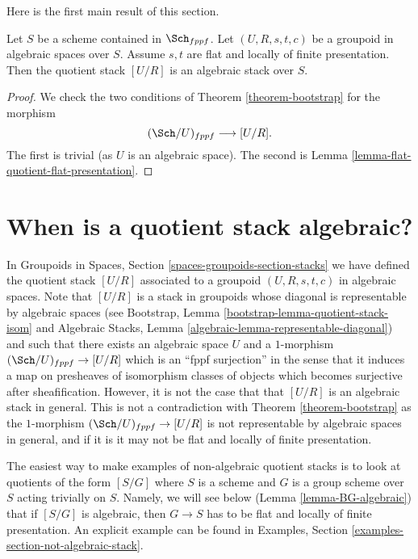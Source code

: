 \noindent
Here is the first main result of this section.

\begin{theorem}
\label{theorem-flat-groupoid-gives-algebraic-stack}
Let $S$ be a scheme contained in $\Sch_{fppf}$.
Let $(U, R, s, t, c)$ be a groupoid in algebraic spaces over $S$.
Assume $s, t$ are flat and locally of finite presentation.
Then the quotient stack $[U/R]$ is an algebraic stack over $S$.
\end{theorem}

\begin{proof}
We check the two conditions of
Theorem \ref{theorem-bootstrap}
for the morphism
$$
(\Sch/U)_{fppf} \longrightarrow [U/R].
$$
The first is trivial (as $U$ is an algebraic space).
The second is
Lemma \ref{lemma-flat-quotient-flat-presentation}.
\end{proof}









\section{When is a quotient stack algebraic?}
\label{section-quotient-algebraic}

\noindent
In
Groupoids in Spaces, Section \ref{spaces-groupoids-section-stacks}
we have defined the quotient stack $[U/R]$ associated to a groupoid
$(U, R, s, t, c)$ in algebraic spaces. Note that $[U/R]$ is a stack
in groupoids whose diagonal is representable by algebraic spaces (see
Bootstrap, Lemma \ref{bootstrap-lemma-quotient-stack-isom}
and
Algebraic Stacks, Lemma \ref{algebraic-lemma-representable-diagonal})
and such that there exists an algebraic space $U$ and a $1$-morphism
$(\Sch/U)_{fppf} \to [U/R]$ which is an ``fppf surjection''
in the sense that it induces a map on presheaves of isomorphism classes of
objects which becomes surjective after sheafification.
However, it is not the case that that $[U/R]$ is an algebraic
stack in general. This is not a contradiction with
Theorem \ref{theorem-bootstrap}
as the $1$-morphism $(\Sch/U)_{fppf} \to [U/R]$ is not
representable by algebraic spaces in general, and if it is it may not
be flat and locally of finite presentation.

\medskip\noindent
The easiest way to make examples of non-algebraic quotient stacks is
to look at quotients of the form $[S/G]$ where $S$ is a scheme and $G$
is a group scheme over $S$ acting trivially on $S$. Namely, we will see
below
(Lemma \ref{lemma-BG-algebraic})
that if $[S/G]$ is algebraic, then $G \to S$ has to be flat and locally
of finite presentation. An explicit example can be found in
Examples, Section \ref{examples-section-not-algebraic-stack}.

